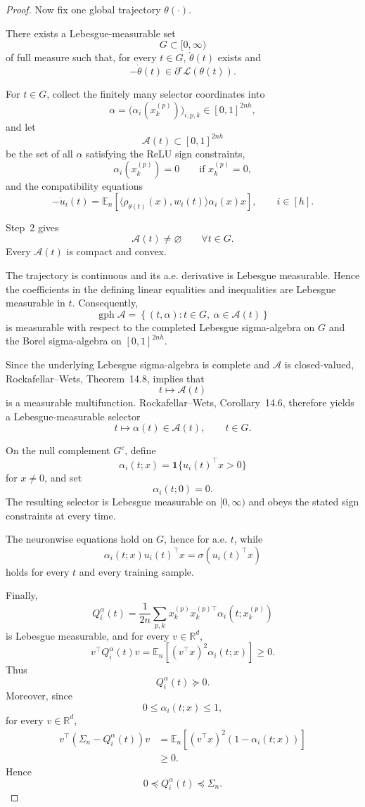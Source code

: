 \documentclass{article} %
\theoremstyle{plain}
\theoremstyle{definition}
\theoremstyle{remark}
\begin{document}
\begin{proof}
Now fix one global trajectory $\theta(\cdot)$.

There exists a Lebesgue-measurable set
\[
G\subset[0,\infty)
\]
of full measure such that, for every $t\in G$, $\dot\theta(t)$ exists and
\[
-\dot\theta(t)
\in
\partial^\circ\mathcal L(\theta(t)).
\]

For $t\in G$, collect the finitely many selector coordinates into
\[
\alpha
=
\bigl(
\alpha_i(x_k^{(p)})
\bigr)_{i,p,k}
\in
[0,1]^{2nh},
\]
and let
\[
\mathcal A(t)
\subset
[0,1]^{2nh}
\]
be the set of all $\alpha$ satisfying the ReLU sign constraints,
\[
\alpha_i(x_k^{(p)})=0
\qquad
\text{if }x_k^{(p)}=0,
\]
and the compatibility equations
\[
-\dot u_i(t)
=
\mathbb E_n
\left[
\langle
\rho_{\theta(t)}(x),
w_i(t)
\rangle
\alpha_i(x)x
\right],
\qquad
i\in[h].
\]

Step~2 gives
\[
\mathcal A(t)\neq\varnothing
\qquad
\forall t\in G.
\]
Every $\mathcal A(t)$ is compact and convex.

The trajectory is continuous and its a.e. derivative is Lebesgue measurable.
Hence the coefficients in the defining linear equalities and inequalities
are Lebesgue measurable in $t$. Consequently,
\[
\operatorname{gph}\mathcal A
=
\left\{
(t,\alpha):
t\in G,\ 
\alpha\in\mathcal A(t)
\right\}
\]
is measurable with respect to the completed Lebesgue sigma-algebra on $G$
and the Borel sigma-algebra on $[0,1]^{2nh}$.

Since the underlying Lebesgue sigma-algebra is complete and
$\mathcal A$ is closed-valued, Rockafellar--Wets,
Theorem~14.8, implies that
\[
t\longmapsto\mathcal A(t)
\]
is a measurable multifunction. Rockafellar--Wets,
Corollary~14.6, therefore yields a Lebesgue-measurable selector
\[
t\longmapsto\alpha(t)\in\mathcal A(t),
\qquad
t\in G.
\]

On the null complement $G^c$, define
\[
\alpha_i(t;x)
=
\mathbf 1
\{
u_i(t)^\top x>0
\}
\]
for $x\neq0$, and set
\[
\alpha_i(t;0)=0.
\]
The resulting selector is Lebesgue measurable on $[0,\infty)$ and obeys the
stated sign constraints at every time.

The neuronwise equations hold on $G$, hence for a.e. $t$, while
\[
\alpha_i(t;x)u_i(t)^\top x
=
\sigma(u_i(t)^\top x)
\]
holds for every $t$ and every training sample.

Finally,
\[
Q_i^\alpha(t)
=
\frac1{2n}
\sum_{p,k}
x_k^{(p)}
x_k^{(p)\top}
\alpha_i(t;x_k^{(p)})
\]
is Lebesgue measurable, and for every $v\in\mathbb R^d$,
\[
v^\top Q_i^\alpha(t)v
=
\mathbb E_n
\left[
(v^\top x)^2
\alpha_i(t;x)
\right]
\ge0.
\]
Thus
\[
Q_i^\alpha(t)\succeq0.
\]
Moreover, since
\[
0\le\alpha_i(t;x)\le1,
\]
for every $v\in\mathbb R^d$,
\[
\begin{aligned}
v^\top
\left(
\Sigma_n-Q_i^\alpha(t)
\right)v
&=
\mathbb E_n
\left[
(v^\top x)^2
\left(
1-\alpha_i(t;x)
\right)
\right]
\\
&\ge0.
\end{aligned}
\]
Hence
\[
\boxed{
0
\preceq
Q_i^\alpha(t)
\preceq
\Sigma_n.
}
\]


\end{proof}
\end{document}
